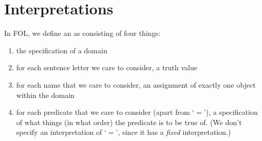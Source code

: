 \documentclass[12pt, a4paper, twoside, openright, titlepage]{book}
\begin{document}
\section{\textsection Interpretations}

\begin{defn}{}{}
    In FOL, we define an  as consisting of four things: \begin{enumerate}
        \item the specification of a domain
        \item for each sentence letter we care to consider, a truth value
        \item for each name that we care to consider, an assignment of exactly one object within the domain
        \item for each predicate that we care to consider (apart from `$=$'), a specification of what things (in what order) the predicate is to be true of. (We don't specify an interpretation of `$=$', since it has a \emph{fixed} interpretation.)
    \end{enumerate}
\end{defn}
\end{document}
